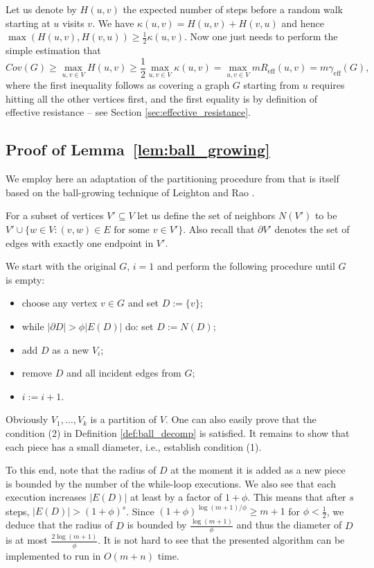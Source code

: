 \documentclass[11pt, letterpaper]{article}
\newcommand{\Reff}{R_{\mathrm{eff}}}
\newcommand{\diameff}{\gamma_{\mathrm{eff}}}
\begin{document}
Let us denote by $H(u,v)$ the expected number of steps before a random walk starting at $u$ visits $v$. We have $\kappa(u,v) = H(u,v) + H(v,u)$ and hence $\max(H(u,v), H(v,u)) \ge \frac 12 \kappa(u,v)$. Now one just needs to perform the simple estimation that
\[
Cov(G) \ge \max_{u,v \in V} H(u,v) \ge \frac 12 \max_{u,v \in V} \kappa(u,v) = \max_{u,v \in V} m \Reff(u,v) = m \diameff(G),
\]
where the first inequality follows as covering a graph $G$ starting from $u$ requires hitting all the other vertices first, and the first equality is by definition of effective resistance -- see Section \ref{sec:effective_resistance}.

\subsection{Proof of Lemma~\ref{lem:ball_growing}}\label{app:ball_growing}

We employ here an adaptation of the partitioning procedure from \cite{KelnerM09} that is itself based on the ball-growing technique of Leighton and Rao \cite{LeightonR99}. 

For a subset of vertices $V'\subseteq V$ let us define the set of neighbors $N(V')$ to be $V'\cup \{w\in V: (v,w) \in E \mbox{ for some }v\in V'\}$. Also recall that $\partial V'$ denotes the set of edges with exactly one endpoint in $V'$.

We start with the original $G$, $i=1$ and perform the following procedure until $G$ is empty:
\begin{itemize}\addtolength{\itemsep}{-.5\baselineskip}
	\item choose any vertex $v \in G$ and set $D:=\{v\}$;
	\item while $|\partial D|>\phi |E(D)|$ do: set $D:=N(D)$;
	\item add $D$ as a new $V_i$;
	\item remove $D$ and all incident edges from $G$;
	\item $i:=i+1$.
\end{itemize}
Obviously $V_1,\ldots, V_k$ is a partition of $V$. One can also easily prove that the condition (2) in Definition \ref{def:ball_decomp} is satisfied.  It remains to show that each piece has a small diameter, i.e., establish condition (1). 

To this end, note that the radius of $D$ at the moment it is added as a new piece is bounded by the number of the while-loop executions. We also see that each execution increases $|E(D)|$ at least by a factor of $1+\phi$. This means that after $s$ steps, $|E(D)|>(1+\phi)^s$. Since $(1+\phi)^{\log (m+1)/\phi}\geq m+1$ for $\phi<\frac 12$, we deduce that the radius of $D$ is bounded by $\frac{\log (m+1)}{\phi}$ and thus the diameter of $D$ is at most $\frac{2\log (m+1)}{\phi}$. It is not hard to see that the presented algorithm can be implemented to run in $O(m+n)$ time.
\end{document}
